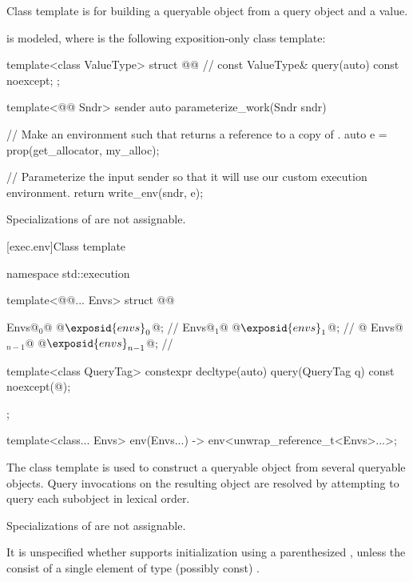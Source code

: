 \pnum
Class template  is for building a queryable object
from a query object and a value.

\pnum
\mandates
{}
is modeled,
where  is the following exposition-only class template:
\begin{codeblock}
template<class ValueType>
struct @@ {              // \expos
  const ValueType& query(auto) const noexcept;
};
\end{codeblock}

\pnum
\begin{example}
\begin{codeblock}
template<@@ Sndr>
sender auto parameterize_work(Sndr sndr) {
  // Make an environment such that  returns a reference to a copy of .
  auto e = prop(get_allocator, my_alloc{});

  // Parameterize the input sender so that it will use our custom execution environment.
  return write_env(sndr, e);
}
\end{codeblock}
\end{example}

\pnum
Specializations of  are not assignable.

[exec.env]{Class template }

\begin{codeblock}
namespace std::execution {
  template<@@... Envs>
  struct @@ {
    Envs@$_0$@ @$\exposid{envs}_0$@;               // \expos
    Envs@$_1$@ @$\exposid{envs}_1$@;               // \expos
      @\vdots@
    Envs@$_{n-1}$@ @$\exposid{envs}_{n-1}$@;           // \expos

    template<class QueryTag>
      constexpr decltype(auto) query(QueryTag q) const noexcept(@\seebelow@);
  };

  template<class... Envs>
    env(Envs...) -> env<unwrap_reference_t<Envs>...>;
}
\end{codeblock}

\pnum
The class template  is used to construct a queryable object
from several queryable objects.
Query invocations on the resulting object are resolved
by attempting to query each subobject in lexical order.

\pnum
Specializations of  are not assignable.

\pnum
It is unspecified
whether  supports initialization
using a parenthesized ,
unless the  consist of
a single element of type (possibly const) .

